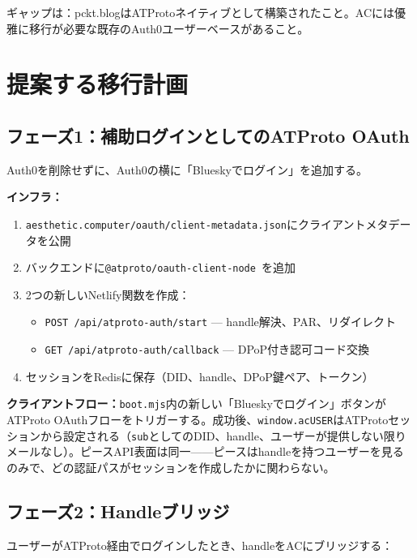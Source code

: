 \documentclass[10pt,letterpaper,twocolumn]{article}
\begin{document}
ギャップは：pckt.blogはATProtoネイティブとして構築されたこと。ACには優雅に移行が必要な既存のAuth0ユーザーベースがあること。


\section{提案する移行計画}
\label{sec:migration}

\subsection{フェーズ1：補助ログインとしてのATProto OAuth}

Auth0を削除せずに、Auth0の横に「Blueskyでログイン」を追加する。

\textbf{インフラ：}
\begin{enumerate}
  \item \texttt{aesthetic.computer/oauth/client-metadata.json}にクライアントメタデータを公開
  \item バックエンドに\texttt{@atproto/oauth-client-node}~\citep{npmAtprotoOauth}を追加
  \item 2つの新しいNetlify関数を作成：
    \begin{itemize}
      \item \texttt{POST /api/atproto-auth/start} --- handle解決、PAR、リダイレクト
      \item \texttt{GET /api/atproto-auth/callback} --- DPoP付き認可コード交換
    \end{itemize}
  \item セッションをRedisに保存（DID、handle、DPoP鍵ペア、トークン）
\end{enumerate}

\textbf{クライアントフロー：}\texttt{boot.mjs}内の新しい「Blueskyでログイン」ボタンがATProto OAuthフローをトリガーする。成功後、\texttt{window.acUSER}はATProtoセッションから設定される（\texttt{sub}としてのDID、handle、ユーザーが提供しない限りメールなし）。ピースAPI表面は同一——ピースはhandleを持つユーザーを見るのみで、どの認証パスがセッションを作成したかに関わらない。

\subsection{フェーズ2：Handleブリッジ}

ユーザーがATProto経由でログインしたとき、handleをACにブリッジする：
\end{document}
